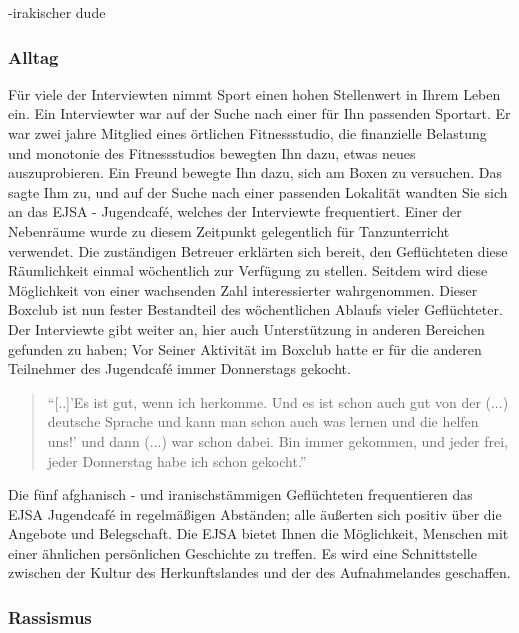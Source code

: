     -irakischer dude

\subsubsection{Alltag}
Für viele der Interviewten nimmt Sport einen hohen Stellenwert in Ihrem Leben ein. Ein Interviewter war auf der Suche nach einer für Ihn passenden Sportart. Er war zwei jahre Mitglied eines örtlichen Fitnessstudio, die finanzielle Belastung und monotonie des Fitnessstudios bewegten Ihn dazu, etwas neues auszuprobieren. Ein Freund bewegte Ihn dazu, sich am Boxen zu versuchen. Das sagte Ihm zu, und auf der Suche nach einer passenden Lokalität wandten Sie sich an das EJSA - Jugendcafé, welches der Interviewte frequentiert. Einer der Nebenräume wurde zu diesem Zeitpunkt gelegentlich für Tanzunterricht verwendet. Die zuständigen Betreuer erklärten sich bereit, den Geflüchteten diese Räumlichkeit einmal wöchentlich zur Verfügung zu stellen. Seitdem wird diese Möglichkeit von einer wachsenden Zahl interessierter wahrgenommen.\newline
Dieser Boxclub ist nun fester Bestandteil des wöchentlichen Ablaufs vieler Geflüchteter. Der Interviewte gibt weiter an, hier auch Unterstützung in anderen Bereichen gefunden zu haben; Vor Seiner Aktivität im Boxclub hatte er für die anderen Teilnehmer des Jugendcafé immer Donnerstags gekocht.
\begin{quote}
    ``[..]'Es ist gut, wenn ich herkomme. Und es ist schon auch gut von der (...) deutsche Sprache und kann man schon auch was lernen und die helfen uns!' und dann (...) war schon dabei. Bin immer gekommen, und jeder frei, jeder Donnerstag habe ich schon gekocht.''
\end{quote}
Die fünf afghanisch - und iranischstämmigen Geflüchteten frequentieren das EJSA Jugendcafé in regelmäßigen Abständen; alle äußerten sich positiv über die Angebote und Belegschaft. Die EJSA bietet Ihnen die Möglichkeit, Menschen mit einer ähnlichen persönlichen Geschichte zu treffen. Es wird eine Schnittstelle zwischen der Kultur des Herkunftslandes und der des Aufnahmelandes geschaffen.

\subsubsection{Rassismus}

